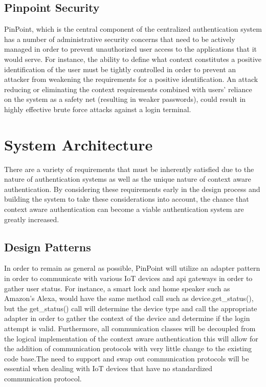 \documentclass[11pt,journal]{IEEEtran}
\begin{document}
\subsection{Pinpoint Security}
PinPoint, which is the central component of the centralized authentication system has a number of administrative security concerns that need to be actively managed in order to prevent unauthorized user access to the applications that it would serve.  For instance, the ability to define what context constitutes a positive identification of the user must be tightly controlled in order to prevent an attacker from weakening the 
requirements for a positive identification.  An attack reducing or eliminating the context requirements combined with users’ reliance on the system as a safety net (resulting in weaker passwords), could result in highly effective brute force attacks against a login terminal.

\section{System Architecture}
There are a variety of requirements that must be inherently satisfied due to the nature of authentication systems as well as the unique nature of context aware authentication.  By considering these requirements early in the design process and building the system to take these considerations into account, the chance that context aware authentication can become a viable authentication system are greatly increased.

\subsection{Design Patterns}
In order to remain as general as possible, PinPoint will utilize an adapter pattern in order to communicate with various IoT devices and api gateways in order to gather user status.  For instance, a smart lock and home speaker such as Amazon’s Alexa, would have the same method call such as device.get\_status(), but the get\_status() call will determine the device type and call the appropriate adapter in order to gather the context of the device and determine if the login attempt is valid.  Furthermore, all communication classes will be decoupled from the logical implementation of the context aware authentication this will allow for the addition of communication protocols with very little change to the existing code base.The need to support and swap out communication protocols will be essential when dealing with IoT devices that have no standardized communication protocol.
\end{document}
